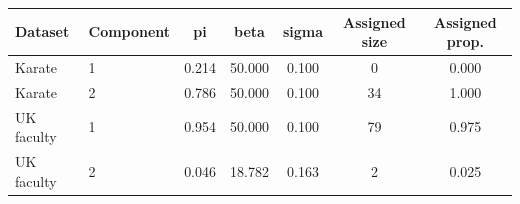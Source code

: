 \begin{tabular}{llccccc}
\hline
Dataset & Component & pi & beta & sigma & Assigned size & Assigned prop. \\
\hline
Karate & 1 & 0.214 & 50.000 & 0.100 &  0 & 0.000 \\
Karate & 2 & 0.786 & 50.000 & 0.100 & 34 & 1.000 \\
UK faculty & 1 & 0.954 & 50.000 & 0.100 & 79 & 0.975 \\
UK faculty & 2 & 0.046 & 18.782 & 0.163 &  2 & 0.025 \\
\hline
\end{tabular}
